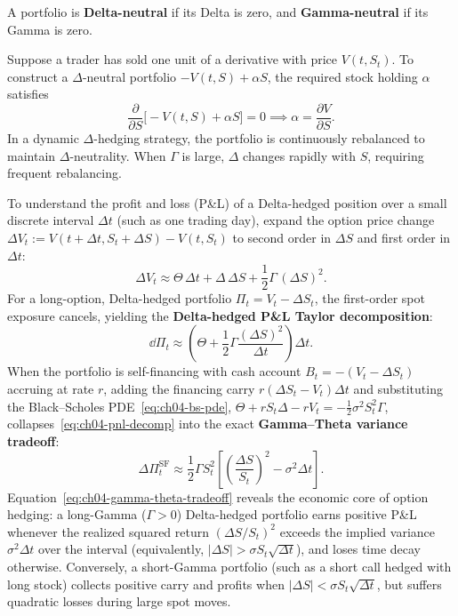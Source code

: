 \begin{definition}
    \label{def:ch04-neutral}
    A portfolio is \textbf{Delta-neutral} if its Delta is zero, and \textbf{Gamma-neutral} if its Gamma is zero.
\end{definition}

Suppose a trader has sold one unit of a derivative with price $V(t, S_t)$. To construct a $\Delta$-neutral portfolio $-V(t, S) + \alpha S$, the required stock holding $\alpha$ satisfies
\[
    \frac{\partial}{\partial S}\bigl[-V(t, S) + \alpha S\bigr] = 0
    \implies \alpha = \frac{\partial V}{\partial S}.
\]
In a dynamic $\Delta$-hedging strategy, the portfolio is continuously rebalanced to maintain $\Delta$-neutrality. When $\Gamma$ is large, $\Delta$ changes rapidly with $S$, requiring frequent rebalancing.

To understand the profit and loss (P\&L) of a Delta-hedged position over a small discrete interval $\Delta t$ (such as one trading day), expand the option price change $\Delta V_t := V(t + \Delta t, S_t + \Delta S) - V(t, S_t)$ to second order in $\Delta S$ and first order in $\Delta t$:
\[
    \Delta V_t \approx \Theta\,\Delta t + \Delta\,\Delta S + \frac{1}{2}\Gamma\,(\Delta S)^2.
\]
For a long-option, Delta-hedged portfolio $\Pi_t = V_t - \Delta S_t$, the first-order spot exposure cancels, yielding the \textbf{Delta-hedged P\&L Taylor decomposition}:
\begin{equation}
    \label{eq:ch04-pnl-decomp}
    \dd\Pi_t \approx \left(\Theta + \frac{1}{2}\Gamma\frac{(\Delta S)^2}{\Delta t}\right)\Delta t.
\end{equation}
When the portfolio is self-financing with cash account $B_t = -(V_t - \Delta S_t)$ accruing at rate $r$, adding the financing carry $r(\Delta S_t - V_t)\Delta t$ and substituting the Black--Scholes PDE~\eqref{eq:ch04-bs-pde}, $\Theta + r S_t \Delta - r V_t = -\frac{1}{2}\sigma^2 S_t^2 \Gamma$, collapses~\eqref{eq:ch04-pnl-decomp} into the exact \textbf{Gamma--Theta variance tradeoff}:
\begin{equation}
    \label{eq:ch04-gamma-theta-tradeoff}
    \Delta \Pi_t^{\mathrm{SF}}
    \approx \frac{1}{2}\Gamma S_t^2 \left[\left(\frac{\Delta S}{S_t}\right)^2 - \sigma^2 \Delta t\right].
\end{equation}
Equation~\eqref{eq:ch04-gamma-theta-tradeoff} reveals the economic core of option hedging: a long-Gamma ($\Gamma > 0$) Delta-hedged portfolio earns positive P\&L whenever the realized squared return $(\Delta S / S_t)^2$ exceeds the implied variance $\sigma^2 \Delta t$ over the interval (equivalently, $|\Delta S| > \sigma S_t \sqrt{\Delta t}$), and loses time decay otherwise. Conversely, a short-Gamma portfolio (such as a short call hedged with long stock) collects positive carry and profits when $|\Delta S| < \sigma S_t \sqrt{\Delta t}$, but suffers quadratic losses during large spot moves.

